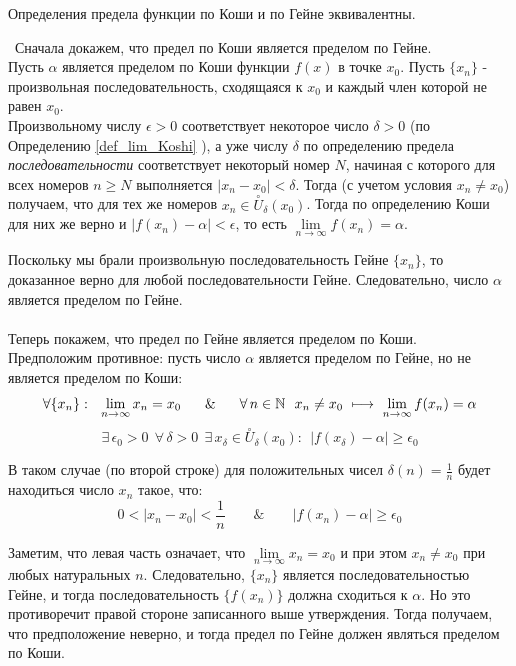 \begin{theorem}
Определения предела функции по Коши и по Гейне эквивалентны.

\vspace{2mm}

\proofname~Сначала докажем, что предел по Коши является пределом по Гейне. \\
Пусть \(\alpha\) является пределом по Коши функции \(f(x)\) в точке \(x_{0}\).
Пусть \(\{x_{n}\}\) - произвольная последовательность, сходящаяся к \(x_{0}\)
и каждый член которой не равен \(x_{0}\). \\

Произвольному числу \(\epsilon > 0\) соответствует некоторое число \(\delta > 0\)
(по Определению \ref{def_lim_Koshi} ), а уже числу \(\delta\) по определению предела \textit{последовательности}
соответствует некоторый номер \(N\), начиная с которого для всех номеров \(n \geq N\)
выполняется \(|x_{n} - x_{0}| < \delta\). Тогда (с учетом условия \(x_{n} \neq x_{0}\))
получаем, что для тех же номеров \(x_{n} \in \overset{\circ}{U}_{\delta}(x_{0})\).
Тогда по определению Коши для них же верно и \(|f(x_{n}) - \alpha| < \epsilon\),
то есть \(\lim\limits_{n \to \infty}{f(x_{n})} = \alpha\).

Поскольку мы брали произвольную последовательность Гейне \(\{x_{n}\}\), то доказанное
верно для любой последовательности Гейне. Следовательно, число \(\alpha\)
является пределом по Гейне.\\
\\
Теперь покажем, что предел по Гейне является пределом по Коши.\\
Предположим противное: пусть число \(\alpha\) является пределом по Гейне,
но не является пределом по Коши:
\[
\forall \{x_{n}\} : ~~ \lim_{ n \to \infty } x_{n} = x_{0} \hspace{6mm} \& \hspace{6mm}
\forall \, n \in \mathbb{N} ~~ x_{n} \neq x_{0} ~ \longmapsto ~ \lim_{ n \to \infty }f(x_{n}) = \alpha
\]
\[ \exists \, \epsilon_{0} > 0 ~~ \forall \, \delta > 0 ~~ \exists \, x_{\delta}
\in \overset{\circ}{U}_{\delta} (x_{0}) : ~~ |f(x_{\delta}) - \alpha| \geq \epsilon_{0}
\]

В таком случае (по второй строке) для положительных чисел \(\delta(n) = \frac{1}{n}\)
будет находиться число \(x_{n}\) такое, что:
\[
0 < |x_{n} - x_{0}| < \frac{1}{n} \qquad \& \qquad|f(x_{n}) - \alpha| \geq \epsilon_{0}
\]

Заметим, что левая часть означает, что \(\lim\limits_{n \to \infty}{x_{n}} = x_{0}\)
и при этом \(x_{n} \neq x_{0}\) при любых натуральных \(n\).
Следовательно, \(\{x_{n}\}\) является последовательностью Гейне, и тогда последовательность
\(\{f(x_{n})\}\) должна сходиться к \(\alpha\). Но это противоречит правой стороне
записанного выше утверждения. Тогда получаем, что предположение неверно, и тогда
предел по Гейне должен являться пределом по Коши.~\qedsymbol
\end{theorem}

